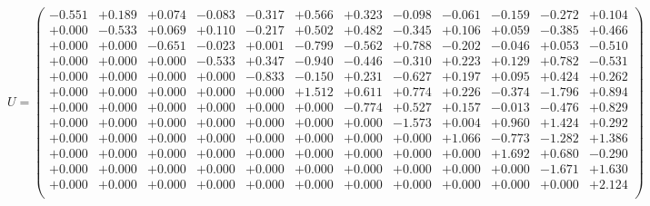 \documentclass[9pt]{article}
\theoremstyle{plain}
\theoremstyle{definition}
\theoremstyle{remark}
\numberwithin{equation}{section}
\begin{document}
$U = \left(
\begin{array}{
cccccccccccc}
-0.551 & +0.189 & +0.074 & -0.083 & -0.317 & +0.566 & +0.323 & -0.098 & -0.061 & -0.159 & -0.272 & +0.104 \\
+0.000 & -0.533 & +0.069 & +0.110 & -0.217 & +0.502 & +0.482 & -0.345 & +0.106 & +0.059 & -0.385 & +0.466 \\
+0.000 & +0.000 & -0.651 & -0.023 & +0.001 & -0.799 & -0.562 & +0.788 & -0.202 & -0.046 & +0.053 & -0.510 \\
+0.000 & +0.000 & +0.000 & -0.533 & +0.347 & -0.940 & -0.446 & -0.310 & +0.223 & +0.129 & +0.782 & -0.531 \\
+0.000 & +0.000 & +0.000 & +0.000 & -0.833 & -0.150 & +0.231 & -0.627 & +0.197 & +0.095 & +0.424 & +0.262 \\
+0.000 & +0.000 & +0.000 & +0.000 & +0.000 & +1.512 & +0.611 & +0.774 & +0.226 & -0.374 & -1.796 & +0.894 \\
+0.000 & +0.000 & +0.000 & +0.000 & +0.000 & +0.000 & -0.774 & +0.527 & +0.157 & -0.013 & -0.476 & +0.829 \\
+0.000 & +0.000 & +0.000 & +0.000 & +0.000 & +0.000 & +0.000 & -1.573 & +0.004 & +0.960 & +1.424 & +0.292 \\
+0.000 & +0.000 & +0.000 & +0.000 & +0.000 & +0.000 & +0.000 & +0.000 & +1.066 & -0.773 & -1.282 & +1.386 \\
+0.000 & +0.000 & +0.000 & +0.000 & +0.000 & +0.000 & +0.000 & +0.000 & +0.000 & +1.692 & +0.680 & -0.290 \\
+0.000 & +0.000 & +0.000 & +0.000 & +0.000 & +0.000 & +0.000 & +0.000 & +0.000 & +0.000 & -1.671 & +1.630 \\
+0.000 & +0.000 & +0.000 & +0.000 & +0.000 & +0.000 & +0.000 & +0.000 & +0.000 & +0.000 & +0.000 & +2.124 \\
\end{array}
\right)$ \newline 
\end{document}
